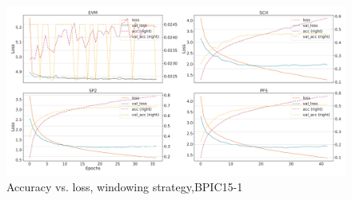 \begin{figure}[!htb]
    \centering
    \includegraphics[width=\textwidth]{gfx/bpic2015_1/windowed_loss_acc_curve.pdf}
    \caption{Accuracy vs. loss, windowing strategy,BPIC15-1}
\end{figure}
\FloatBarrier

